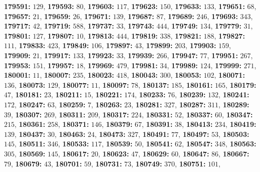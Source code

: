 \textsf{\bfseries 179591:} $129$, \textsf{\bfseries 179593:} $80$, \textsf{\bfseries 179603:} $117$, \textsf{\bfseries 179623:} $150$, \textsf{\bfseries 179633:} $133$, \textsf{\bfseries 179651:} $68$, \textsf{\bfseries 179657:} $21$, \textsf{\bfseries 179659:} $26$, \textsf{\bfseries 179671:} $139$, \textsf{\bfseries 179687:} $87$, \textsf{\bfseries 179689:} $246$, \textsf{\bfseries 179693:} $343$, \textsf{\bfseries 179717:} $42$, \textsf{\bfseries 179719:} $588$, \textsf{\bfseries 179737:} $33$, \textsf{\bfseries 179743:} $444$, \textsf{\bfseries 179749:} $134$, \textsf{\bfseries 179779:} $31$, \textsf{\bfseries 179801:} $127$, \textsf{\bfseries 179807:} $10$, \textsf{\bfseries 179813:} $444$, \textsf{\bfseries 179819:} $338$, \textsf{\bfseries 179821:} $188$, \textsf{\bfseries 179827:} $111$, \textsf{\bfseries 179833:} $423$, \textsf{\bfseries 179849:} $106$, \textsf{\bfseries 179897:} $43$, \textsf{\bfseries 179899:} $203$, \textsf{\bfseries 179903:} $159$, \textsf{\bfseries 179909:} $21$, \textsf{\bfseries 179917:} $133$, \textsf{\bfseries 179923:} $33$, \textsf{\bfseries 179939:} $266$, \textsf{\bfseries 179947:} $77$, \textsf{\bfseries 179951:} $267$, \textsf{\bfseries 179953:} $151$, \textsf{\bfseries 179957:} $18$, \textsf{\bfseries 179969:} $479$, \textsf{\bfseries 179981:} $34$, \textsf{\bfseries 179989:} $124$, \textsf{\bfseries 179999:} $271$, \textsf{\bfseries 180001:} $11$, \textsf{\bfseries 180007:} $235$, \textsf{\bfseries 180023:} $418$, \textsf{\bfseries 180043:} $300$, \textsf{\bfseries 180053:} $102$, \textsf{\bfseries 180071:} $136$, \textsf{\bfseries 180073:} $129$, \textsf{\bfseries 180077:} $11$, \textsf{\bfseries 180097:} $78$, \textsf{\bfseries 180137:} $185$, \textsf{\bfseries 180161:} $165$, \textsf{\bfseries 180179:} $47$, \textsf{\bfseries 180181:} $23$, \textsf{\bfseries 180211:} $15$, \textsf{\bfseries 180221:} $174$, \textsf{\bfseries 180233:} $76$, \textsf{\bfseries 180239:} $132$, \textsf{\bfseries 180241:} $172$, \textsf{\bfseries 180247:} $63$, \textsf{\bfseries 180259:} $7$, \textsf{\bfseries 180263:} $23$, \textsf{\bfseries 180281:} $327$, \textsf{\bfseries 180287:} $311$, \textsf{\bfseries 180289:} $39$, \textsf{\bfseries 180307:} $269$, \textsf{\bfseries 180311:} $209$, \textsf{\bfseries 180317:} $224$, \textsf{\bfseries 180331:} $52$, \textsf{\bfseries 180337:} $60$, \textsf{\bfseries 180347:} $215$, \textsf{\bfseries 180361:} $258$, \textsf{\bfseries 180371:} $146$, \textsf{\bfseries 180379:} $67$, \textsf{\bfseries 180391:} $38$, \textsf{\bfseries 180413:} $234$, \textsf{\bfseries 180419:} $139$, \textsf{\bfseries 180437:} $30$, \textsf{\bfseries 180463:} $24$, \textsf{\bfseries 180473:} $327$, \textsf{\bfseries 180491:} $77$, \textsf{\bfseries 180497:} $53$, \textsf{\bfseries 180503:} $145$, \textsf{\bfseries 180511:} $346$, \textsf{\bfseries 180533:} $117$, \textsf{\bfseries 180539:} $50$, \textsf{\bfseries 180541:} $62$, \textsf{\bfseries 180547:} $348$, \textsf{\bfseries 180563:} $305$, \textsf{\bfseries 180569:} $145$, \textsf{\bfseries 180617:} $20$, \textsf{\bfseries 180623:} $47$, \textsf{\bfseries 180629:} $60$, \textsf{\bfseries 180647:} $86$, \textsf{\bfseries 180667:} $79$, \textsf{\bfseries 180679:} $43$, \textsf{\bfseries 180701:} $59$, \textsf{\bfseries 180731:} $73$, \textsf{\bfseries 180749:} $370$, \textsf{\bfseries 180751:} $101$, 
